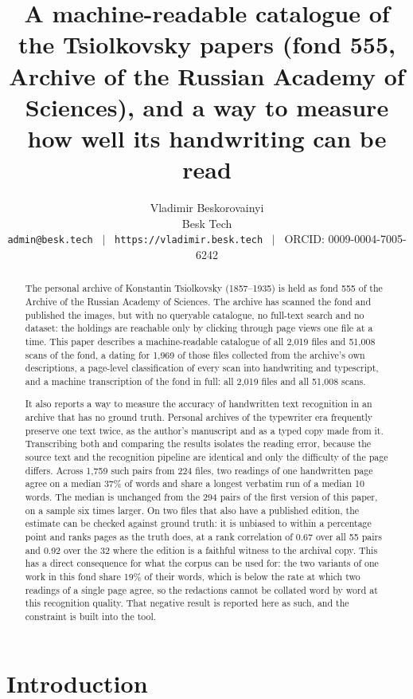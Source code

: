\documentclass[11pt,a4paper]{article}
\title{A machine-readable catalogue of the Tsiolkovsky papers (fond 555, Archive of the Russian Academy of Sciences), and a way to measure how well its handwriting can be read}
\author{Vladimir Beskorovainyi \\[2pt]
\small Besk Tech \\[2pt]
\small \texttt{admin@besk.tech} \ $|$ \ \texttt{https://vladimir.besk.tech} \ $|$ \ ORCID: 0009-0004-7005-6242}
\date{}
\begin{document}
\maketitle
\begin{abstract}

The personal archive of Konstantin Tsiolkovsky (1857--1935) is held as fond 555
of the Archive of the Russian Academy of Sciences. The archive has scanned the
fond and published the images, but with no queryable catalogue, no full-text
search and no dataset: the holdings are reachable only by clicking through
page
views one file at a time. This paper describes a machine-readable catalogue of
all 2,019 files and 51,008 scans of the fond, a dating for 1,969 of those
files
collected from the archive's own descriptions, a page-level classification of
every scan into handwriting and typescript, and a machine transcription of
the fond in full: all 2,019 files and all 51,008 scans.

It also reports a way to measure the accuracy of handwritten text recognition
in an archive that has no ground truth. Personal archives of the typewriter
era
frequently preserve one text twice, as the author's manuscript and as a typed
copy made from it. Transcribing both and comparing the results isolates the
reading error, because the source text and the recognition pipeline are
identical and only the difficulty of the page differs. Across 1,759 such pairs
from 224 files, two readings of one handwritten page agree on a
median 37\% of words and share a longest verbatim run of a median 10 words. The
median is unchanged from the 294 pairs of the first version of this paper, on
a
sample six times larger. On
two files that also have a published edition, the estimate can be checked
against ground truth: it is unbiased to within a percentage point and ranks
pages as the truth does, at a rank correlation of 0.67 over all 55 pairs and
0.92 over the 32 where the edition is a faithful witness to the archival copy.
This has a direct consequence for what
the corpus can be used for: the two variants of one work in this fond share
19\% of their words, which
is below the rate at which two readings of a single page agree, so the
redactions cannot be collated word by word at this recognition quality. That
negative result is reported here as such, and the constraint is built into the
tool.
\end{abstract}

\section{Introduction}\label{introduction}
\end{document}
